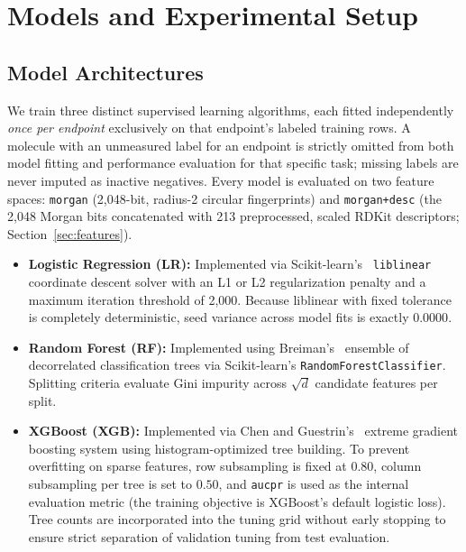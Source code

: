 \section{Models and Experimental Setup}
\label{sec:models_setup}

\subsection{Model Architectures}
We train three distinct supervised learning algorithms, each fitted independently \emph{once per endpoint} exclusively on that endpoint's labeled training rows. A molecule with an unmeasured label for an endpoint is strictly omitted from both model fitting and performance evaluation for that specific task; missing labels are never imputed as inactive negatives. Every model is evaluated on two feature spaces: \texttt{morgan} (2,048-bit, radius-2 circular fingerprints) and \texttt{morgan+desc} (the 2,048 Morgan bits concatenated with 213 preprocessed, scaled RDKit descriptors; Section~\ref{sec:features}).

\begin{itemize}
    \item \textbf{Logistic Regression (LR):} Implemented via Scikit-learn's~\cite{pedregosa2011scikit} \texttt{liblinear} coordinate descent solver with an L1 or L2 regularization penalty and a maximum iteration threshold of 2,000. Because liblinear with fixed tolerance is completely deterministic, seed variance across model fits is exactly $0.0000$.
    \item \textbf{Random Forest (RF):} Implemented using Breiman's~\cite{breiman2001random} ensemble of decorrelated classification trees via Scikit-learn's \texttt{RandomForestClassifier}. Splitting criteria evaluate Gini impurity across $\sqrt{d}$ candidate features per split.
    \item \textbf{XGBoost (XGB):} Implemented via Chen and Guestrin's~\cite{chen2016xgboost} extreme gradient boosting system using histogram-optimized tree building. To prevent overfitting on sparse features, row subsampling is fixed at $0.80$, column subsampling per tree is set to $0.50$, and \texttt{aucpr} is used as the internal evaluation metric (the training objective is XGBoost's default logistic loss). Tree counts are incorporated into the tuning grid without early stopping to ensure strict separation of validation tuning from test evaluation.
\end{itemize}

